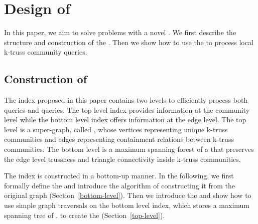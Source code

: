 \section{Design of \TwoLevelIndex{}}
\label{index}

In this paper, we aim to solve \probdef{} problems with a novel \twolevelindex{}. We first describe the structure and construction of the \twolevelindex{}. Then we show how to use the \twolevelindex{} to process local k-truss community queries.

\subsection{Construction of \TwoLevelIndex{}}
\label{index}

The index proposed in this paper contains two levels to efficiently process both \toplevelprob{} queries and \bottomlevelprob{} queries. The top level index provides information at the community level while the bottom level index offers information at the edge level. The top level is a super-graph, called \treeindex{}, whose vertices representing unique k-truss communities and edges representing containment relations between k-truss communities. 
The bottom level is a maximum spanning forest of a \inducedgraph{} that preserves the edge level trussness and triangle connectivity inside k-truss communities. 

The index is constructed in a bottom-up manner. In the following, we first formally define the \inducedgraph{} and introduce the algorithm of constructing it from the original graph (Section~\ref{bottom-level}). Then we introduce the \treeindex{} and show how to use simple graph traversals on the bottom level index, which stores a maximum spanning tree of \inducedgraph{}, to create the \treeindex{} (Section~\ref{top-level}). 

